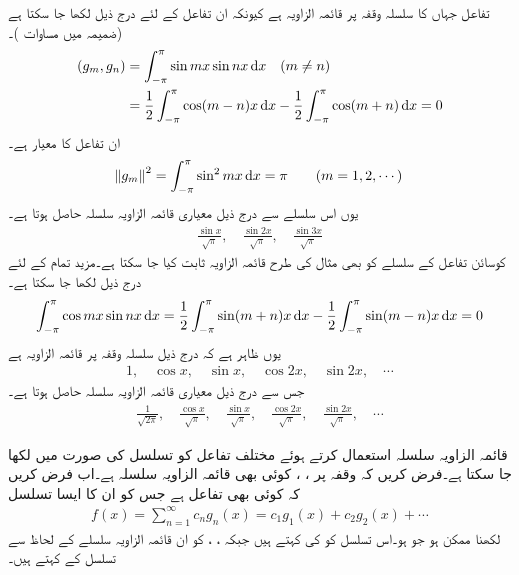 تفاعل   جہاں  کا سلسلہ وقفہ  پر قائمہ الزاویہ ہے کیونکہ ان تفاعل کے لئے درج ذیل لکھا جا سکتا ہے (ضمیمہ  میں مساوات )۔
\begin{gather}
\begin{aligned}
(g_m,g_n)&=\int_{-\pi}^{\pi}\sin mx\sin nx\dif x\quad (m\ne n)\\
&=\frac{1}{2}\int_{-\pi}^{\pi}\cos(m-n)x\dif x-\frac{1}{2}\int_{-\pi}^{\pi}\cos(m+n)\dif x=0
\end{aligned}
\end{gather}
ان تفاعل کا معیار   ہے۔
\begin{align*}
\norm{g_m}^2=\int_{-\pi}^{\pi} \sin^2 mx\dif x=\pi\quad \quad (m=1,2,\cdots)
\end{align*} 
یوں اس سلسلے سے درج ذیل معیاری قائمہ الزاویہ سلسلہ حاصل ہوتا ہے۔
\begin{align*}
\frac{\sin x}{\sqrt{\pi}},\quad \frac{\sin 2x}{\sqrt{\pi}},\quad \frac{\sin 3x}{\sqrt{\pi}}
\end{align*} 
کوسائن تفاعل  کے سلسلے کو بھی مثال  کی طرح قائمہ الزاویہ ثابت کیا جا سکتا ہے۔مزید تمام  کے لئے درج ذیل لکھا جا سکتا ہے۔
\begin{align*}
\int_{-\pi}^{\pi} \cos mx \sin nx \dif x=\frac{1}{2}\int_{-\pi}^{\pi}\sin(m+n)x\dif x-\frac{1}{2}\int_{-\pi}^{\pi}\sin(m-n)x \dif x=0
\end{align*}
یوں ظاہر ہے کہ درج ذیل سلسلہ  وقفہ  پر قائمہ الزاویہ ہے
\begin{align*}
1,\quad \cos x,\quad \sin x,\quad \cos 2x,\quad \sin 2x,\quad \cdots
\end{align*}
جس سے درج ذیل معیاری قائمہ الزاویہ سلسلہ حاصل ہوتا ہے۔
\begin{align*}
\frac{1}{\sqrt{2\pi}},\quad \frac{\cos x}{\sqrt{\pi}},\quad \frac{\sin x}{\sqrt{\pi}},\quad \frac{\cos 2x}{\sqrt{\pi}},\quad \frac{\sin 2x}{\sqrt{\pi}},\quad \cdots
\end{align*}

قائمہ الزاویہ سلسلہ استعمال کرتے ہوئے مختلف تفاعل کو تسلسل کی صورت میں لکھا جا سکتا ہے۔فرض کریں کہ وقفہ  پر ، ،  کوئی بھی قائمہ الزاویہ سلسلہ ہے۔اب فرض کریں کہ  کوئی بھی تفاعل ہے جس کو ان  کا ایسا تسلسل
\begin{align}\label{مساوات_طاقتی_اضافی_فوریئر_عمومی_الف}
f(x)=\sum_{n=1}^{\infty} c_n g_n(x)=c_1g_1(x)+c_2g_2(x)+\cdots
\end{align}
لکھنا ممکن ہو جو  ہو۔اس تسلسل کو  کی  کہتے ہیں جبکہ ، ،  کو ان قائمہ الزاویہ سلسلے کے لحاظ سے تسلسل کے  کہتے ہیں۔ 

